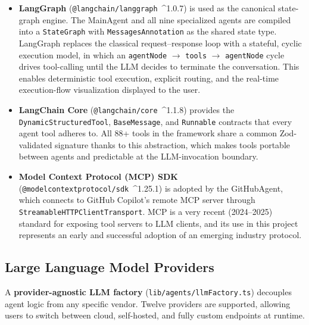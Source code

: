 \documentclass[11pt,a4paper]{report}
\newcommand{\code}[1]{\texttt{\small #1}}
\begin{document}
\begin{itemize}
  \item \textbf{LangGraph} (\code{@langchain/langgraph}\ \^{}1.0.7) is used as the canonical state-graph engine. The MainAgent and all nine specialized agents are compiled into a \code{StateGraph} with \code{MessagesAnnotation} as the shared state type. LangGraph replaces the classical request--response loop with a stateful, cyclic execution model, in which an \code{agentNode} $\rightarrow$ \code{tools} $\rightarrow$ \code{agentNode} cycle drives tool-calling until the LLM decides to terminate the conversation. This enables deterministic tool execution, explicit routing, and the real-time execution-flow visualization displayed to the user.
  \item \textbf{LangChain Core} (\code{@langchain/core}\ \^{}1.1.8) provides the \code{DynamicStructuredTool}, \code{BaseMessage}, and \code{Runnable} contracts that every agent tool adheres to. All 88+ tools in the framework share a common Zod-validated signature thanks to this abstraction, which makes tools portable between agents and predictable at the LLM-invocation boundary.
  \item \textbf{Model Context Protocol (MCP) SDK} (\code{@modelcontextprotocol/sdk}\ \^{}1.25.1) is adopted by the GitHubAgent, which connects to GitHub Copilot's remote MCP server through \code{StreamableHTTPClientTransport}. MCP is a very recent (2024--2025) standard for exposing tool servers to LLM clients, and its use in this project represents an early and successful adoption of an emerging industry protocol.
\end{itemize}

\subsection{Large Language Model Providers}

A \textbf{provider-agnostic LLM factory} (\code{lib/agents/llmFactory.ts})
decouples agent logic from any specific vendor. Twelve providers are
supported, allowing users to switch between cloud, self-hosted, and fully
custom endpoints at runtime.
\end{document}
